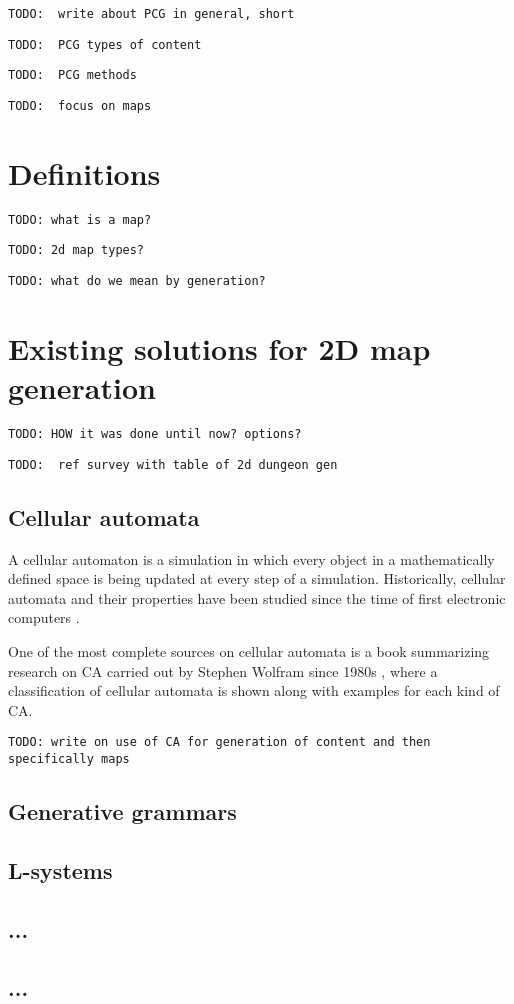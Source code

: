 \documentclass[12pt]{report}
\newcommand{\todo}[1]{}
\renewcommand{\todo}[1]{{\color{red} \par \noindent \footnotesize \texttt{TODO: {#1} }}}
\begin{document}
\todo{ write about PCG in general, short }
\todo{ PCG types of content }
\todo{ PCG methods }
\todo{ focus on maps }

\section{Definitions} 



\todo{what is a map?}
\todo{2d map types?}
\todo{what do we mean by generation?}



\section{Existing solutions for 2D map generation}

\todo{HOW it was done until now? options?}
\todo{ ref survey with table of 2d dungeon gen}

\subsection{Cellular automata}

A cellular automaton is a simulation in which every object in a mathematically defined space is being updated at every step of a simulation. Historically, cellular automata and their properties have been studied since the time of first electronic computers \autocite{Sarkar:2000:BHC:349194.349202}.

One of the most complete sources on cellular automata is a book summarizing research on CA carried out by Stephen Wolfram since 1980s \autocite{wolfram2002new}, where a classification of cellular automata is shown along with examples for each kind of CA. 

\todo{write on use of CA for generation of content and then specifically maps }


\subsection{Generative grammars}
\subsection{L-systems}
\subsection{...}
\subsection{...}
\end{document}
